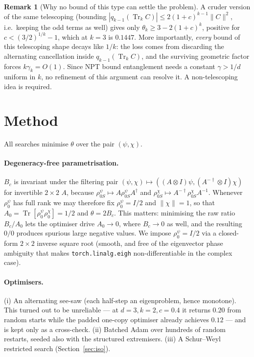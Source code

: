 \documentclass[11pt]{article}
\theoremstyle{definition}
\newtheorem{remark}{Remark}
\theoremstyle{plain}
\newcommand{\Tr}{\operatorname{Tr}}
\begin{document}
\begin{remark}[Why no bound of this type can settle the problem]
A cruder version of the same telescoping (bounding $|q_{k-1}(\Tr_kC)|\le2(1+c)^{k-1}\|C\|^2$,
i.e.\ keeping the odd terms as well) gives only $\theta_k\ge3-2(1+c)^k$, positive for
$c<(3/2)^{1/k}-1$, which at $k=3$ is $0.1447$. More importantly, \emph{every} bound of this
telescoping shape decays like $1/k$: the loss comes from discarding the alternating
cancellation inside $q_{k-1}(\Tr_kC)$, and the surviving geometric factor forces
$k\gamma_k=O(1)$. Since NPT bound entanglement needs a constant $\gamma>1/d$ uniform in $k$,
no refinement of this argument can resolve it. A non-telescoping idea is required.
\end{remark}

\section{Method}

All searches minimise $\theta$ over the pair $(\psi,\chi)$.

\paragraph{Degeneracy-free parametrisation.} $B_c$ is invariant under the filtering pair
$(\psi,\chi)\mapsto((A\otimes I)\psi,(A^{-\dagger}\otimes I)\chi)$ for invertible $2\times2$
$A$, because $\rho^\psi_{0S}\mapsto A\rho^\psi_{0S}A^\dagger$ and
$\rho^\chi_{0S}\mapsto A^{-\dagger}\rho^\chi_{0S}A^{-1}$. Whenever $\rho^\psi_0$ has full
rank we may therefore fix $\rho^\psi_0=I/2$ and $\|\chi\|=1$, so that
$A_0=\Tr[\rho^\psi_0\rho^\chi_0]=1/2$ and $\theta=2B_c$. This matters: minimising the raw
ratio $B_c/A_0$ lets the optimiser drive $A_0\to0$, where $B_c\to0$ as well, and the
resulting $0/0$ produces spurious large negative values. We impose $\rho^\psi_0=I/2$ via a
closed-form $2\times2$ inverse square root (smooth, and free of the eigenvector phase
ambiguity that makes \texttt{torch.linalg.eigh} non-differentiable in the complex case).

\paragraph{Optimisers.} (i) An alternating see-saw (each half-step an eigenproblem, hence
monotone). This turned out to be unreliable --- at $d=3,k=2,c=0.4$ it returns $0.20$ from
random starts while the padded one-copy optimiser already achieves $0.12$ --- and is kept
only as a cross-check. (ii) Batched Adam over hundreds of random restarts, seeded also with
the structured extremisers. (iii) A Schur--Weyl restricted search (Section~\ref{sec:iso}).
\end{document}
